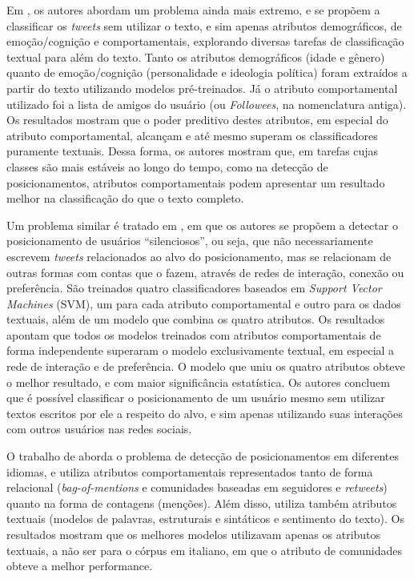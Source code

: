 \documentclass[
	12pt, oneside, a4paper, english, brazil
]{abntex2ppgsi}
\begin{document}
Em , os autores abordam um problema ainda mais extremo, e se propõem a classificar os {\em tweets} sem utilizar o texto, e sim apenas atributos demográficos, de emoção/cognição e comportamentais, explorando diversas tarefas de classificação textual para além do texto. Tanto os atributos demográficos (idade e gênero) quanto de emoção/cognição (personalidade e ideologia política) foram extraídos a partir do texto utilizando modelos pré-treinados. Já o atributo comportamental utilizado foi a lista de amigos do usuário (ou {\em Followees}, na nomenclatura antiga). Os resultados mostram que o poder preditivo destes atributos, em especial do atributo comportamental, alcançam e até mesmo superam os classificadores puramente textuais. Dessa forma, os autores mostram que, em tarefas cujas classes são mais estáveis ao longo do tempo, como na detecção de posicionamentos, atributos comportamentais podem apresentar um resultado melhor na classificação do que o texto completo.

Um problema similar é tratado em , em que os autores se propõem a detectar o posicionamento de usuários ``silenciosos'', ou seja, que não necessariamente escrevem {\em tweets} relacionados ao alvo do posicionamento, mas se relacionam de outras formas com contas que o fazem, através de redes de interação, conexão ou preferência. São treinados quatro classificadores baseados em {\em Support Vector Machines} (SVM), um para cada atributo comportamental e outro para os dados textuais, além de um modelo que combina os quatro atributos. Os resultados apontam que todos os modelos treinados com atributos comportamentais de forma independente superaram o modelo exclusivamente textual, em especial a rede de interação e de preferência. O modelo que uniu os quatro atributos obteve o melhor resultado, e com maior significância estatística. Os autores concluem que é possível classificar o posicionamento de um usuário mesmo sem utilizar textos escritos por ele a respeito do alvo, e sim apenas utilizando suas interações com outros usuários nas redes sociais.

O trabalho de  aborda o problema de detecção de posicionamentos em diferentes idiomas, e utiliza atributos comportamentais representados tanto de forma relacional ({\em bag-of-mentions} e comunidades baseadas em seguidores e {\em retweets}) quanto na forma de contagens (menções). Além disso, utiliza também atributos textuais (modelos de palavras, estruturais e sintáticos e sentimento do texto). Os resultados mostram que os melhores modelos utilizavam apenas os atributos textuais, a não ser para o córpus em italiano, em que o atributo de comunidades obteve a melhor performance. 
\end{document}
